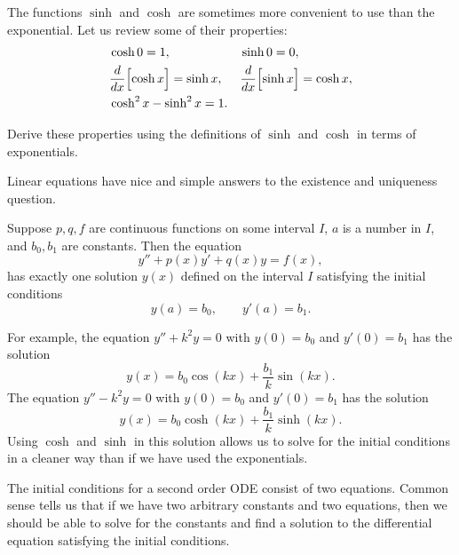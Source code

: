 The functions $\sinh$ and $\cosh$ are sometimes more convenient to use than the
exponential.  Let us review some of their properties:
\begin{align*}
& \cosh 0  = 1 , &   & \sinh 0 = 0 , \\
& \frac{d}{dx} \Bigl[ \cosh x \Bigr] = \sinh x , &  & \frac{d}{dx} \Bigl[ \sinh x \Bigr] = \cosh x , \\
& \cosh^2 x - \sinh^2 x = 1 .
\end{align*}


\begin{exercise}
Derive these properties using the definitions of $\sinh$
and $\cosh$ in terms of exponentials.
\end{exercise}


Linear equations have nice and simple
answers to the existence and uniqueness question.

\begin{theorem}
Suppose $p, q, f$ are continuous functions on some interval
$I$, $a$ is a number in $I$,
and $b_0, b_1$ are constants.
Then the equation
\begin{equation*}
y'' + p(x) y' + q(x) y = f(x) ,
\end{equation*}
has exactly one solution $y(x)$ defined on the interval $I$ satisfying the initial conditions
\begin{equation*}
y(a) = b_0 , \qquad y'(a) = b_1 .
\end{equation*}
\end{theorem}

For example, the equation $y'' + k^2 y = 0$ with $y(0) = b_0$ and $y'(0) = b_1$
has the solution
\begin{equation*}
y(x) = b_0 \cos (kx) + \frac{b_1}{k} \sin (kx) .
\end{equation*}
The equation $y'' - k^2 y = 0$ with $y(0) = b_0$ and $y'(0) = b_1$
has the solution
\begin{equation*}
y(x) = b_0 \cosh (kx) + \frac{b_1}{k} \sinh (kx) .
\end{equation*}
Using $\cosh$ and $\sinh$ in this solution allows us to solve for
the initial conditions
in a cleaner way
than if we have used the exponentials.

\medskip

The initial conditions for a second order ODE consist of two
equations.  Common sense tells us that
if we have two arbitrary constants and two equations, then we should 
be able to solve
for the constants and find a solution to the differential equation
satisfying the initial conditions.


